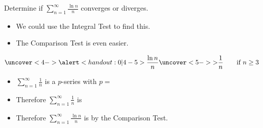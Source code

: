 \begin{frame}
\begin{example}[Example 2, p. 742]
Determine if $\sum_{n=1}^\infty \frac{\ln n}{n}$ converges or diverges.
\begin{itemize}
\item<2->  We could use the Integral Test to find this.
\item<3->  The Comparison Test is even easier.
\end{itemize}
\abovedisplayskip=0pt
\belowdisplayskip=0pt
\[
\uncover<4->{%
\alert<handout:0| 4-5>{%
\frac{\ln n}{n} \uncover<5->{ > } \frac{1}{n} \qquad \textrm{if} \ n \geq 3
}}%
\]
\begin{itemize}
\item<6->  $\sum_{n=1}^\infty \frac{1}{n}$ is a $p$-series with \alert<handout:0| 6-7>{$p = $ }
\item<8-| alert@8-9>  Therefore $\sum_{n=1}^\infty \frac{1}{n}$ is 
\item<10-| alert@10-11>  Therefore $\sum_{n=1}^\infty \frac{\ln n}{n}$ is  by the Comparison Test.
\end{itemize}
\end{example}
\end{frame}
